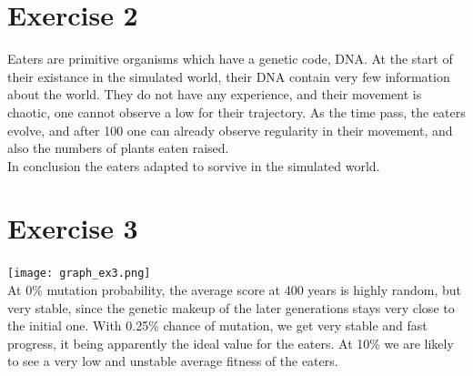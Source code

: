 \documentclass[a4paper,10pt]{article}
\begin{document}
\section*{Exercise 2}
Eaters are primitive organisms which have a genetic code, DNA. At the start of their existance in the simulated world,
their DNA contain very few information about the world. They do not have any experience, and their movement is chaotic,
one cannot observe a low for their trajectory. As the time pass, the eaters evolve, and after 100 one can already observe
regularity in their movement, and also the numbers of plants eaten raised.\\ In conclusion the eaters adapted to sorvive
in the simulated world.

\section*{Exercise 3}
\texttt{[image: graph\_ex3.png]}\\
At 0\% mutation probability, the average score at 400 years is highly random, but very stable, since the genetic makeup of the later generations stays very close to the initial one. With 0.25\% chance of mutation, we get very stable and fast progress, it being apparently the ideal value for the eaters. At 10\% we are likely to see a very low and unstable average fitness of the eaters.
\end{document}
